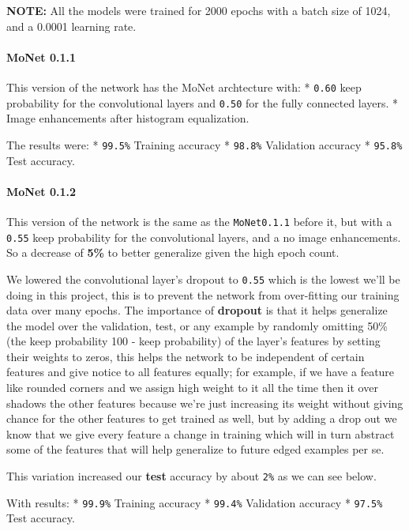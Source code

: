 \documentclass[11pt]{article}
\begin{document}
\textbf{NOTE:} All the models were trained for 2000 epochs with a batch
size of 1024, and a 0.0001 learning rate.

\hypertarget{monet-0.1.1}{%
\paragraph{MoNet 0.1.1}\label{monet-0.1.1}}

This version of the network has the MoNet archtecture with: *
\texttt{0.60} keep probability for the convolutional layers and
\texttt{0.50} for the fully connected layers. * Image enhancements after
histogram equalization.

The results were: * \texttt{99.5\%} Training accuracy * \texttt{98.8\%}
Validation accuracy * \texttt{95.8\%} Test accuracy.

\hypertarget{monet-0.1.2}{%
\paragraph{MoNet 0.1.2}\label{monet-0.1.2}}

This version of the network is the same as the \texttt{MoNet0.1.1}
before it, but with a \texttt{0.55} keep probability for the
convolutional layers, and a no image enhancements. So a decrease of
\textbf{5\%} to better generalize given the high epoch count.

We lowered the convolutional layer's dropout to \texttt{0.55} which is
the lowest we'll be doing in this project, this is to prevent the
network from over-fitting our training data over many epochs. The
importance of \textbf{dropout} is that it helps generalize the model
over the validation, test, or any example by randomly omitting 50\% (the
keep probability 100 - keep probability) of the layer's features by
setting their weights to zeros, this helps the network to be independent
of certain features and give notice to all features equally; for
example, if we have a feature like rounded corners and we assign high
weight to it all the time then it over shadows the other features
because we're just increasing its weight without giving chance for the
other features to get trained as well, but by adding a drop out we know
that we give every feature a change in training which will in turn
abstract some of the features that will help generalize to future edged
examples per se.

This variation increased our \textbf{test} accuracy by about
\texttt{2\%} as we can see below.

With results: * \texttt{99.9\%} Training accuracy * \texttt{99.4\%}
Validation accuracy * \texttt{97.5\%} Test accuracy.
\end{document}
